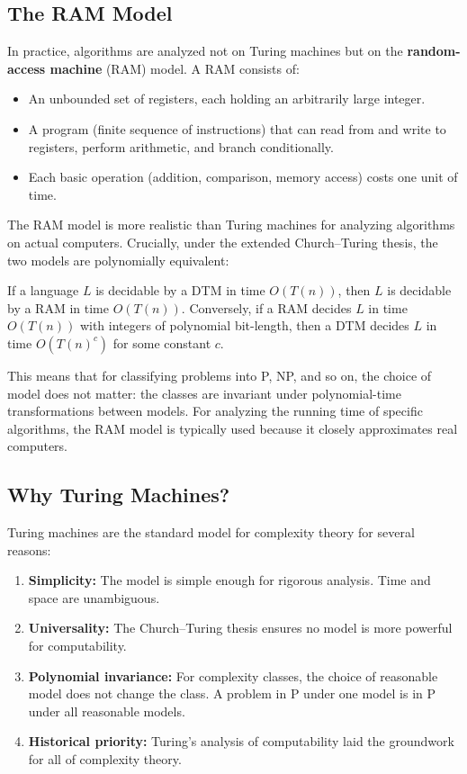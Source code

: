 \subsection{The RAM Model}

In practice, algorithms are analyzed not on Turing machines but on the \textbf{random-access machine} (RAM) model. A RAM consists of:
\begin{itemize}
  \item An unbounded set of registers, each holding an arbitrarily large integer.
  \item A program (finite sequence of instructions) that can read from and write to registers, perform arithmetic, and branch conditionally.
  \item Each basic operation (addition, comparison, memory access) costs one unit of time.
\end{itemize}

The RAM model is more realistic than Turing machines for analyzing algorithms on actual computers. Crucially, under the extended Church--Turing thesis, the two models are polynomially equivalent:

\begin{proposition}
If a language $L$ is decidable by a DTM in time $O(T(n))$, then $L$ is decidable by a RAM in time $O(T(n))$. Conversely, if a RAM decides $L$ in time $O(T(n))$ with integers of polynomial bit-length, then a DTM decides $L$ in time $O(T(n)^c)$ for some constant $c$.
\end{proposition}

This means that for classifying problems into P, NP, and so on, the choice of model does not matter: the classes are invariant under polynomial-time transformations between models. For analyzing the running time of specific algorithms, the RAM model is typically used because it closely approximates real computers.

\subsection{Why Turing Machines?}

Turing machines are the standard model for complexity theory for several reasons:
\begin{enumerate}
  \item \textbf{Simplicity:} The model is simple enough for rigorous analysis. Time and space are unambiguous.
  \item \textbf{Universality:} The Church--Turing thesis ensures no model is more powerful for computability.
  \item \textbf{Polynomial invariance:} For complexity classes, the choice of reasonable model does not change the class. A problem in P under one model is in P under all reasonable models.
  \item \textbf{Historical priority:} Turing's analysis of computability laid the groundwork for all of complexity theory.
\end{enumerate}

